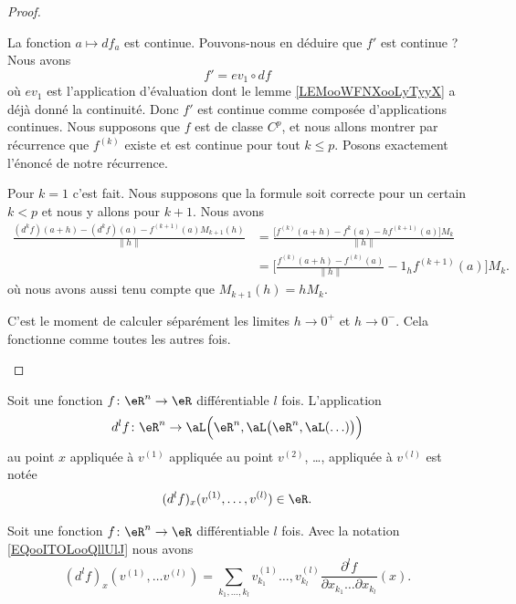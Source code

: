 \begin{proof}
\begin{subproof}
		La fonction \( a\mapsto df_a\) est continue. Pouvons-nous en déduire que \( f'\) est continue ? Nous avons
		\begin{equation}
			f'=ev_1\circ df
		\end{equation}
		où \( ev_1\) est l'application d'évaluation dont le lemme \ref{LEMooWFNXooLyTyyX} a déjà donné la continuité. Donc \( f'\) est continue comme composée d'applications continues.
		Nous supposons que \( f\) est de classe \( C^p\), et nous allons montrer par récurrence que \( f^{(k)}\) existe et est continue pour tout \( k\leq p\). Posons exactement l'énoncé de notre récurrence.

		Pour \( k=1\) c'est fait. Nous supposons que la formule soit correcte pour un certain \( k< p\) et nous y allons pour \( k+1\). Nous avons
		\begin{subequations}        \label{SUBEQSooUPLAooQhueCl}
			\begin{align}
				\frac{ (d^kf)(a+h)-(d^kf)(a)-f^{(k+1)}(a)M_{k+1}(h) }{ \| h \| } & =\frac{ \big[ f^{(k)}(a+h)-f^k(a)-hf^{(k+1)}(a) \big]M_k  }{ \| h \| }       \\
				                                                                 & =\big[ \frac{ f^{(k)}(a+h)-f^{(k)}(a) }{ \| h \| }-1_hf^{(k+1)}(a) \big]M_k.
			\end{align}
		\end{subequations}
		où nous avons aussi tenu compte que \( M_{k+1}(h)=hM_k\).

		C'est le moment de calculer séparément les limites \( h\to 0^+\) et \( h\to 0^-\). Cela fonctionne comme toutes les autres fois.
	\end{subproof}
\end{proof}

Soit une fonction \( f\colon \eR^n\to \eR\) différentiable \( l\) fois. L'application
\begin{equation}
	d^lf\colon \eR^n\to \aL\Big( \eR^n,\aL\big( \eR^n,\aL(\ldots) \big) \Big)
\end{equation}
au point \( x\) appliquée à \( v^{(1)}\) appliquée au point \( v^{(2)}\), \ldots, appliquée à \( v^{(l)}\) est notée
\begin{equation}        \label{EQooITOLooQllUlJ}
	(d^lf)_x(v^{(1)},\ldots ,v^{(l)})\in \eR.
\end{equation}

\begin{proposition}     \label{PROPooQKZIooXTvkIr}
	Soit une fonction \( f\colon \eR^n\to \eR\) différentiable \( l\) fois. Avec la notation \eqref{EQooITOLooQllUlJ} nous avons
	\begin{equation}
		(d^lf)_x(v^{(1)},\ldots v^{(l)})=\sum_{k_1,\ldots, k_l}v^{(1)}_{k_1}\ldots, v_{k_l}^{(l)}\frac{ \partial^lf }{ \partial x_{k_1}\ldots \partial x_{k_l} }(x).
	\end{equation}
\end{proposition}

